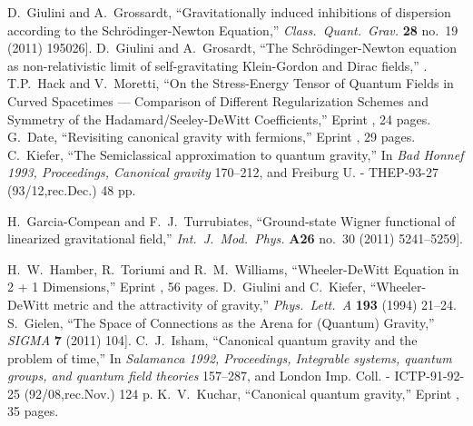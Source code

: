 \begin{thebibliography}{99}
  D.~Giulini and A.~Grossardt,\newblock
  ``Gravitationally induced inhibitions of dispersion according to the Schr\"odinger-Newton Equation,''\newblock
  \emph{Class.\ Quant.\ Grav.} {\bf 28} no.~19 (2011) 195026\newblock
  [\arXiv[gr-qc]{1105.1921}].
  D.~Giulini and A.~Grosardt,\newblock
  ``The Schr\"odinger-Newton equation as non-relativistic limit of self-gravitating Klein-Gordon and Dirac fields,''\newblock
  .
  T.P.~Hack and V.~Moretti,\newblock
  ``On the Stress-Energy Tensor of Quantum Fields in Curved Spacetimes --- Comparison of Different Regularization Schemes and Symmetry of the Hadamard/Seeley-DeWitt Coefficients,''\newblock
  Eprint , 24 pages.
  G.~Date,\newblock
  ``Revisiting canonical gravity with fermions,''\newblock
  Eprint , 29 pages.
  C.~Kiefer,\newblock
  ``The Semiclassical approximation to quantum gravity,''\newblock
  In \emph{Bad Honnef 1993, Proceedings, Canonical gravity} 170--212, and Freiburg U. - THEP-93-27 (93/12,rec.Dec.) 48 pp\newblock
  [\arXiv{gr-qc/9312015}].

  H.~Garcia-Compean and F.~J.~Turrubiates,\newblock
  ``Ground-state Wigner functional of linearized gravitational field,''\newblock
  \emph{Int.\ J.\ Mod.\ Phys.} {\bf A26} no.~30 (2011) 5241--5259\newblock
  [\arXiv[hep-th]{1109.1036}].



  H.~W.~Hamber, R.~Toriumi and R.~M.~Williams,\newblock
  ``Wheeler-DeWitt Equation in 2 + 1 Dimensions,''\newblock
  Eprint , 56 pages.
  D.~Giulini and C.~Kiefer,\newblock
  ``Wheeler-DeWitt metric and the attractivity of gravity,''\newblock
  \emph{Phys.\ Lett.\ A} {\bf 193} (1994) 21--24\newblock
  [\arXiv{gr-qc/9405040}].
  S.~Gielen,\newblock
  ``The Space of Connections as the Arena for (Quantum) Gravity,''\newblock
  \emph{SIGMA} {\bf 7} (2011) 104\newblock
  [\arXiv[gr-qc]{1111.2672}].
  C.~J.~Isham,\newblock
  ``Canonical quantum gravity and the problem of time,''\newblock
  In \emph{Salamanca 1992, Proceedings, Integrable systems, quantum groups, and quantum field theories} 157--287, and London Imp. Coll. - ICTP-91-92-25 (92/08,rec.Nov.) 124 p\newblock
  [\arXiv{gr-qc/9210011}].
  K.~V.~Kuchar,\newblock
  ``Canonical quantum gravity,''\newblock
  Eprint , 35 pages.






\end{thebibliography}
